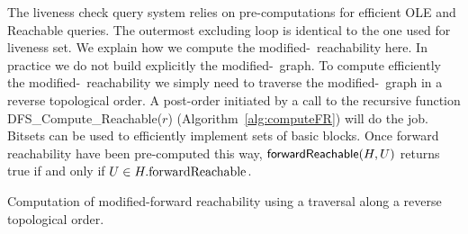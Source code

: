 The liveness check query system relies on pre-computations for efficient \textsf{OLE} and \textsf{{\reduced}Reachable} queries.
The outermost excluding loop is identical to the one used for liveness set.
We explain how we compute the modified-\reduced\ reachability here.
In practice we do not build explicitly the modified-\reduced\ graph.
To compute efficiently the modified-\reduced\ reachability we simply need to traverse the modified-\reduced\ graph in a reverse topological order.
A post-order initiated by a call to the recursive function \textsf{DFS\_Compute\_{\reduced}Reachable}($r$) (Algorithm~\ref{alg:computeFR}) will do the job.
Bitsets can be used to efficiently implement sets of basic blocks.
Once forward reachability have been pre-computed this way, $\textsf{{forward}Reachable}(H,U)$ returns true if and only if $U\in H.\textrm{{forward}Reachable}$.

\begin{algorithm}
\caption{Computation of modified-forward reachability using a traversal along a reverse topological order.}
\label{alg:computeFR}
\end{algorithm}



